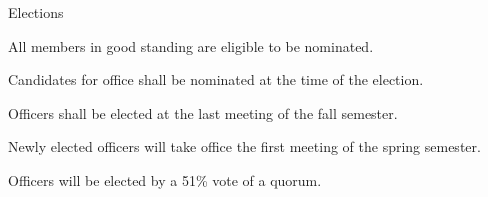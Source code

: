 {
	\begin{article}{Elections}
		\item All members in good standing are eligible to be nominated.
		\item Candidates for office shall be nominated at the time of the election.
		\item Officers shall be elected at the last meeting of the fall semester.
		\item Newly elected officers will take office the first meeting of the spring semester.
		\item Officers will be elected by a 51\% vote of a quorum.
	\end{article}
}